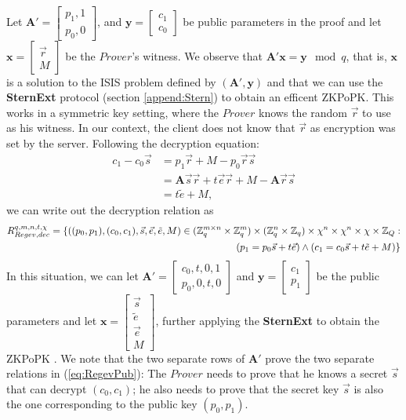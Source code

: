 Let $\mathbf{A}' = \begin{bmatrix}
  p_1, 1\\
  p_0, 0
\end{bmatrix}
$, and $\mathbf{y} = \begin{bmatrix}
  c_1\\c_0
\end{bmatrix}$ be public parameters in the proof and
let $\mathbf{x} = \begin{bmatrix}
  \vec{r}\\
  M
\end{bmatrix}$
be the $Prover$'s witness. We observe that $\mathbf{A'}\mathbf{x}= \mathbf{y} \mod q$, that is, $\mathbf{x}$ is a solution
to the ISIS problem defined by $(\mathbf{A'},\mathbf{y})$ and that we can use the \textbf{SternExt} protocol (section
\ref{append:Stern}) to obtain an efficent ZKPoPK. This works in a symmetric key setting, where the $Prover$ knows
the random $\vec{r}$ to use as his witness. In our context, the client does not know that $\vec{r}$ as encryption was
set by the server. Following the decryption equation:
\begin{align*}
  c_1 - c_0\vec{s} &= p_1\vec{r} + M - p_0\vec{r}\vec{s} \\
                   &= \mathbf{A}\vec{s}\vec{r} + t\vec{e}\vec{r} + M - \mathbf{A}\vec{r}\vec{s}\\
                   &= t\tilde{e} + M,
\end{align*}
we can write out the decryption relation as
\begin{align}
  \label{eq:RegevPub}
  R_{Regev,dec}^{q,m,n,t,\chi} = \{ ((p_0,p_1),(c_0,c_1),\vec{s},\vec{e},\tilde{e}, M) \in (\mathbb{Z}_q^{m \times n} \times \mathbb{Z}_q^{m})
  \times (\mathbb{Z}_q^n \times \mathbb{Z}_q) \times \chi^n \times \chi^n \times \chi \times \mathbb{Z}_Q :\\ \nonumber
  (p_1 = p_0\vec{s} + t\vec{e}) \land (c_1 = c_0\vec{s} + t\tilde{e} + M) \}
\end{align}
In this situation, we can let $\mathbf{A'} = \begin{bmatrix}
  c_0, t, 0 , 1 \\p_0, 0, t, 0
\end{bmatrix}
$
and $\mathbf{y} = \begin{bmatrix}
  c_1\\p_1
\end{bmatrix}$
be the public parameters and let $\mathbf{x} = \begin{bmatrix}
  \vec{s}\\ \tilde{e}\\ \vec{e}\\ M
\end{bmatrix}
$, further applying the \textbf{SternExt} to obtain the ZKPoPK  . We note that the two separate rows of $\mathbf{A'}$ prove the two
separate relations in (\ref{eq:RegevPub}): The $Prover$ needs to prove that he knows a secret $\vec{s}$ that can decrypt
$(c_0,c_1)$; he also needs to prove that the secret key $\vec{s}$ is also the one corresponding to the public key
$(p_0, p_1)$.


